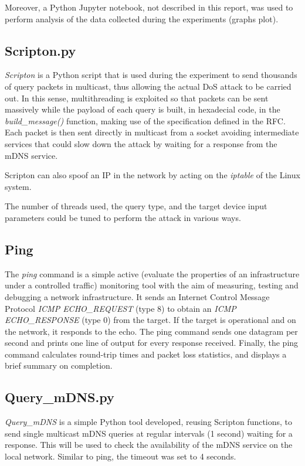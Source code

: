 \documentclass[fleqn, 11pt]{SelfArx} %
\begin{document}
Moreover, a Python Jupyter notebook, not described in this report, was used to perform analysis of the data collected during the experiments (graphs plot).

\subsection{Scripton.py}
\textit{Scripton} is a Python script that is used during the experiment to send thousands of query packets in multicast, thus allowing the actual DoS attack to be carried out.
In this sense, multithreading is exploited so that packets can be sent massively while the payload of each query is built, in hexadecial code, in the \textit{build\_message()} function, making use of the specification defined in the RFC\cite{rfc6762}. Each packet is then sent directly in multicast from a socket avoiding intermediate services that could slow down the attack by waiting for a response from the mDNS service. \newline

Scripton can also spoof an IP in the network by acting on the \textit{iptable} of the Linux system. \newline

The number of threads used, the query type, and the target device input parameters could be tuned to perform the attack in various ways.

\subsection{Ping}
The \textit {ping} \cite{pingManPage} command is a simple active (evaluate the properties of an infrastructure under a controlled traffic) monitoring tool with the aim of measuring, testing and debugging a network infrastructure. It sends an Internet Control Message Protocol \textit{ICMP ECHO\_REQUEST} (type 8) to obtain an \textit{ICMP ECHO\_RESPONSE} (type 0) from the target. If the target is operational and on the network, it responds to the echo. The ping command sends one datagram per second and prints one line of output for every response received. Finally, the ping command calculates round-trip times and packet loss statistics, and displays a brief summary on completion.

\subsection{Query\_mDNS.py}
\textit{Query\_mDNS} is a simple Python tool developed, reusing Scripton functions, to send single multicast mDNS queries at regular intervals (1 second) waiting for a response. This will be used to check the availability of the mDNS service on the local network.\newline
Similar to ping, the timeout was set to 4 seconds.
\end{document}
